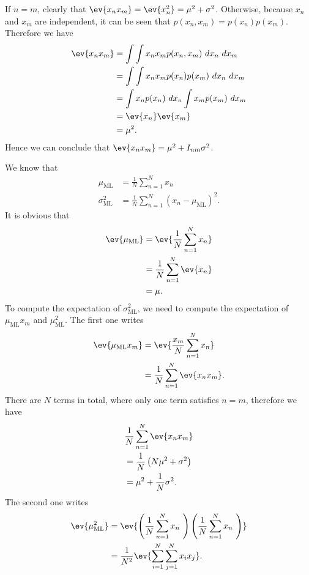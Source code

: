 \begin{answer}{}
	If $n=m$, clearly that $\ev{x_n x_m} = \ev{x_n^2} = \mu^2 + \sigma^2$. Otherwise, because $x_n$ and $x_m$ are independent, it can be seen that $p(x_n, x_m) = p(x_n)p(x_m)$. Therefore we have
	\begin{align}
		\ev{x_n x_m} &= \int\int x_n x_m p(x_n, x_m)\ dx_n\ dx_m\\
		&= \int\int x_n x_m p(x_n)p(x_m)\ dx_n\ dx_m\\
		&= \int x_np(x_n)\ dx_n \int x_mp(x_m)\ dx_m\\
		&= \ev{x_n}\ev{x_m}\\
		&= \mu^2.
	\end{align}
	Hence we can conclude that $\ev{x_n x_m} = \mu^2 + I_{nm}\sigma^2$. 
	
	We know that
	\begin{align}
		\mu_{\mathrm{ML}} &= \frac{1}{N} \sum_{n=1}^{N} x_n\\
		\sigma^2_{\mathrm{ML}} &= \frac{1}{N} \sum_{n=1}^{N} \left( x_n - \mu_{\mathrm{ML}} \right)^2.
	\end{align}
	It is obvious that
	\begin{align}
		\ev{\mu_{\mathrm{ML}}} &= \ev{\frac{1}{N} \sum_{n=1}^{N} x_n}\\
		&= \frac{1}{N} \sum_{n=1}^{N} \ev{x_n}\\
		&= \mu.
	\end{align}
	To compute the expectation of $\sigma^2_{\mathrm{ML}}$, we need to compute the expectation of $\mu_{\mathrm{ML}}x_m$ and $\mu_{\mathrm{ML}}^2$. The first one writes
	\begin{align}
		\ev{\mu_{\mathrm{ML}}x_m} &= \ev{\frac{x_m}{N} \sum_{n=1}^{N} x_n}\\
		&= \frac{1}{N} \sum_{n=1}^{N} \ev{x_n x_m}.
	\end{align}
	There are $N$ terms in total, where only one term satisfies $n = m$, therefore we have
	\begin{align}
		& \frac{1}{N} \sum_{n=1}^{N} \ev{x_n x_m}\\
		&= \frac{1}{N} \left( N\mu^2 + \sigma^2 \right)\\
		&= \mu^2 + \frac{1}{N}\sigma^2.
	\end{align}
	The second one writes
	\begin{align}
		\ev{\mu_{\mathrm{ML}}^2} &= \ev{\left( \frac{1}{N} \sum_{n=1}^{N} x_n\ \right)\left( \frac{1}{N} \sum_{n=1}^{N} x_n\ \right)}\\
			&= \frac{1}{N^2} \ev{\sum_{i=1}^{N}\sum_{j=1}^{N}x_i x_j}.

\end{align}
\end{answer}
